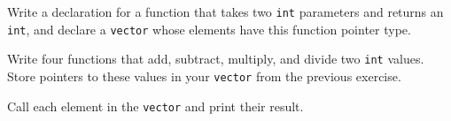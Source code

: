 %
%
\begin{question}
Write a declaration for a function that takes two \verb|int|
parameters and returns an \verb|int|, and declare a \verb|vector| whose elements have
this function pointer type.
\end{question}

\begin{question}
Write four functions that add, subtract, multiply, and divide
two \verb|int| values. Store pointers to these values in your \verb|vector| from the
previous exercise.
\end{question}

\begin{question}
Call each element in the \verb|vector| and print their result.
\end{question}
